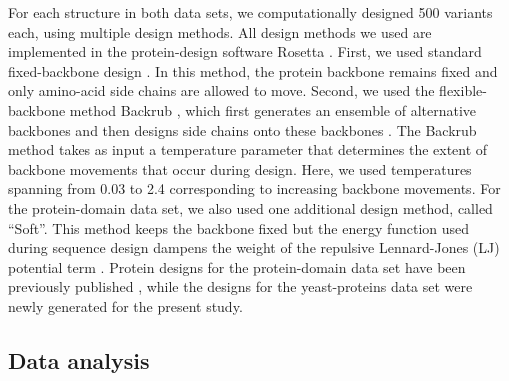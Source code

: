 \documentclass[12pt]{article}
\begin{document}
For each structure in both data sets, we computationally designed 500 variants each, using multiple design methods. All design methods we used are implemented in the protein-design software Rosetta \citep{LeaverFayetal2011}. First, we used standard fixed-backbone design \citep{Kuhlman2003}. In this method, the protein backbone remains fixed and only amino-acid side chains are allowed to move. Second, we used the flexible-backbone method Backrub \citep{Smith2008}, which first generates an ensemble of alternative backbones and then designs side chains onto these backbones \citep{Friedland2009, Smith2010}. The Backrub method takes as input a temperature parameter that determines the extent of backbone movements that occur during design. Here, we used temperatures spanning from 0.03 to 2.4 corresponding to increasing backbone movements. For the protein-domain data set, we also used one additional design method, called ``Soft''. This method keeps the backbone fixed but the energy function used during sequence design dampens the weight of the repulsive Lennard-Jones (LJ) potential term \citep{OllikainenKortemme}.  Protein designs for the protein-domain data set have been previously published \citep{OllikainenKortemme}, while the designs for the yeast-proteins data set were newly generated for the present study.

\subsection{Data analysis}
\end{document}
